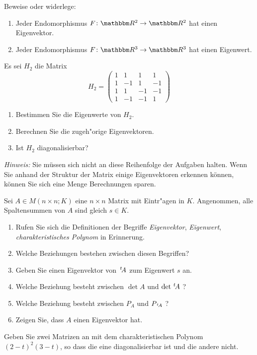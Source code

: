 \documentclass[a4,11pt]{article}
\begin{document}
\vspace*{-17mm}
{
\kopf
}


\begin{aufgabe}[4 Punkte]
  Beweise oder widerlege:
  \begin{enumerate}
  \item Jeder Endomorphismus $F \colon \R^2 \to \R^2$ hat einen
    Eigenvektor.
  \item Jeder Endomorphismus $F \colon \R^3 \to \R^3$ hat einen
    Eigenwert.
  \end{enumerate}
\end{aufgabe}

\begin{aufgabe}[4 Punkte]
Es sei $H_2$ die Matrix
\[
H_2 = \begin{pmatrix}
1 & 1 & 1 & 1\\
1 & -1 & 1 & -1\\
1 & 1 & -1 & -1\\
1 & -1 & -1 & 1
\end{pmatrix}
\]
\begin{enumerate}
\item Bestimmen Sie die Eigenwerte von $H_2$.
\item Berechnen Sie die zugeh"orige Eigenvektoren.
\item Ist $H_2$ diagonalisierbar?
\end{enumerate}

\emph{Hinweis:} Sie müssen sich nicht an diese Reihenfolge der
Aufgaben halten. Wenn Sie anhand der Struktur der Matrix einige
Eigenvektoren erkennen können, können Sie sich eine Menge Berechnungen
sparen.
\end{aufgabe}

\begin{aufgabe}[4 Punkte]
Sei $A \in M(n \times n ; K)$ eine $n \times n$ Matrix mit Eintr"agen in $K$.
Angenommen, alle Spaltensummen von $A$ sind gleich $s \in K$.

\begin{enumerate}
\item Rufen Sie sich die Definitionen der Begriffe \emph{Eigenvektor},
  \emph{Eigenwert}, \emph{charakteristisches Polynom} in Erinnerung.
\item Welche Beziehungen bestehen zwischen diesen Begriffen?
\item Geben Sie einen Eigenvektor von $\,^t\!A$ zum Eigenwert $s$ an.
\item Welche Beziehung besteht zwischen $\det A$ und $\det \,^t\!A$ ?
\item Welche Beziehung besteht zwischen $P_A$ und $P_{\,^t\!A}$ ?
\item Zeigen Sie, dass $A$ einen Eigenvektor hat.
\end{enumerate}

\end{aufgabe}

\begin{aufgabe}[4 Punkte]
  Geben Sie zwei Matrizen an mit dem charakteristischen Polynom
  $(2-t)^2(3-t)$, so dass die eine diagonalisierbar ist und die andere
  nicht.
\end{aufgabe}
\end{document}
